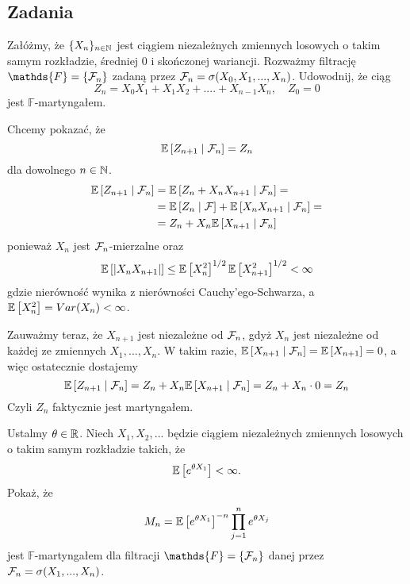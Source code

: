 \subsection{Zadania}

\setcounter{problem}{0}

\begin{problem}
  Załóżmy, że $\{X_n\}_{n\in\operatorname{\mathbb{N}}}$ jest ciągiem niezależnych zmiennych losowych o takim samym rozkładzie, średniej $0$ i skończonej wariancji. Rozważmy filtrację $\mathds{F}=\{\set{F}_n\}$ zadaną przez $\mathcal{F}_n=\sigma(X_0,X_1,...,X_n)$. Udowodnij, że ciąg
  $$Z_n=X_0X_1+X_1X_2+....+X_{n-1}X_n, \quad Z_0=0$$
  jest $\mathds{F}$-martyngałem.
\end{problem}

\begin{solution}
  Chcemy pokazać, że
  $$\expected{Z_{n+1}}{\set{F}_{n}}=Z_n$$
  dla dowolnego $n\in\operatorname{\mathbb{N}}$.
  \begin{align*}
    \expected{Z_{n+1}}{\set{F}_n}&=\expected{Z_n+X_nX_{n+1}}{\set{F}_n}=\\ 
                                 &=\expected{Z_n}{\set{F}}+\expected{X_nX_{n+1}}{\set{F}_n}=\\ 
                                 &=Z_n+X_n\expected{X_{n+1}}{\set{F}_n}
  \end{align*}
  ponieważ $X_n$ jest $\mathcal{F}_n$-mierzalne oraz
  $$\expected{|X_nX_{n+1}|}\leq\expected{X_n^2}^{1/2}\expected{X_{n+1}^2}^{1/2}<\infty$$
  gdzie nierówność wynika z nierówności Cauchy'ego-Schwarza, a $\expected{X_n^2}=Var(X_n)<\infty$.

  Zauważmy teraz, że $X_{n+1}$ jest niezależne od $\mathcal{F}_n$, gdyż $X_n$ jest niezależne od każdej ze zmiennych $X_1,...,X_n$. W takim razie, $\expected{X_{n+1}}{\set{F}_n}=\expected{X_{n+1}}=0$, a więc ostatecznie dostajemy
  $$\expected{Z_{n+1}}{\set{F}_n}=Z_n+X_n\expected{X_{n+1}}{\set{F}_n}=Z_n+X_n\cdot 0=Z_n$$
  Czyli $Z_n$ faktycznie jest martyngałem.
\end{solution}

\begin{problem}
  Ustalmy $\theta\in\operatorname{\mathbb{R}}$. Niech $X_1,X_2,...$ będzie ciągiem niezależnych zmiennych losowych o takim samym rozkładzie takich, że 
  $$\expected{e^{\theta X_1}}<\infty.$$
  Pokaż, że 
  $$M_n=\expected{e^{\theta X_1}}^{-n}\prod_{j=1}^ne^{\theta X_j}$$
  jest $\mathds{F}$-martyngałem dla filtracji $\mathds{F}=\{\set{F}_n\}$ danej przez $\mathcal{F}_n=\sigma(X_1,...,X_n)$.
\end{problem}

